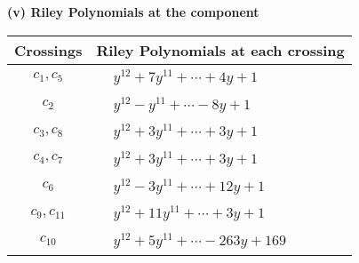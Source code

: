 \documentclass[1p]{elsarticle_modified}
\theoremstyle{definition}
\begin{document}
\newpage\renewcommand{\arraystretch}{1}
\flushleft \textbf{(v) Riley Polynomials at the component}\newline \\
\begin{tabular}{m{50pt}|m{274pt}}
Crossings & \hspace{64pt}Riley Polynomials at each crossing \\
\hline $$\begin{aligned}c_{1},c_{5}\end{aligned}$$&$\begin{aligned}
&y^{12}+7 y^{11}+\cdots+4 y+1
\end{aligned}$\\
\hline $$\begin{aligned}c_{2}\end{aligned}$$&$\begin{aligned}
&y^{12}- y^{11}+\cdots-8 y+1
\end{aligned}$\\
\hline $$\begin{aligned}c_{3},c_{8}\end{aligned}$$&$\begin{aligned}
&y^{12}+3 y^{11}+\cdots+3 y+1
\end{aligned}$\\
\hline $$\begin{aligned}c_{4},c_{7}\end{aligned}$$&$\begin{aligned}
&y^{12}+3 y^{11}+\cdots+3 y+1
\end{aligned}$\\
\hline $$\begin{aligned}c_{6}\end{aligned}$$&$\begin{aligned}
&y^{12}-3 y^{11}+\cdots+12 y+1
\end{aligned}$\\
\hline $$\begin{aligned}c_{9},c_{11}\end{aligned}$$&$\begin{aligned}
&y^{12}+11 y^{11}+\cdots+3 y+1
\end{aligned}$\\
\hline $$\begin{aligned}c_{10}\end{aligned}$$&$\begin{aligned}
&y^{12}+5 y^{11}+\cdots-263 y+169
\end{aligned}$\\
\hline
\end{tabular}\\~\\
\end{document}
